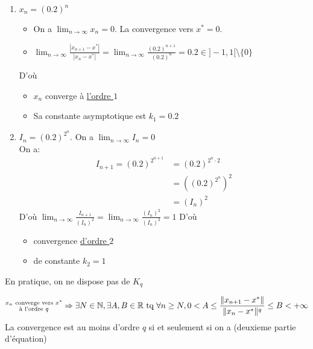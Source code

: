 \documentclass[a4paper]{report}
\begin{document}
\begin{eg}
    \begin{enumerate}
        \item 
   $x_n = (0.2)^n$ 
   \begin{itemize}
       \item On a $\lim_{n \to \infty} x_n = 0$. La convergence vers $x^* = 0$.
       \item  $\lim_{n \to \infty} \frac{|x_{n+1} - x^*|}{|x_n - x^*|} = \lim_{n \to \infty} \frac{(0.2)^{n+1}}{(0.2)^n} = 0.2 \in ]-1, 1[ \setminus \{0\}$
   \end{itemize}
   D'où
   \begin{itemize}
       \item $x_n$ converge à \underline{l'ordre $1$} 
       \item Sa constante asymptotique est \underline{$k_1 = 0.2$}
   \end{itemize}
   \item
       $I_n = (0.2)^{2^n}$. On a  $\lim_{n \to \infty} I_n = 0$\\
       On a:
       \begin{align*}
           I_{n+1} = (0.2)^{2^{n+1}} &= (0.2)^{2^n \cdot 2}\\
                                     &= \left( (0.2)^{2^n} \right)^2\\
                                     &= \left( I_n \right)^2
       \end{align*}
       D'où $\lim_{n \to \infty} \frac{I_{n+1}}{\left( I_n \right)^2} = \lim_{n \to \infty} \frac{\left( I_n \right)^2}{\left( I_n \right)^2} = 1$
       D'où
       \begin{itemize}
           \item convergence \underline{d'ordre $2$}
           \item de constante $k_2 = 1$
       \end{itemize}
\end{enumerate}
\end{eg}
En pratique, on ne dispose pas de $K_q$
 \begin{definition}
    \[
        \substack{x_n \text{ converge vers } x^*\\\text{à l'ordre } q} \Rightarrow \exists N \in \mathbb{N}, \exists A,B \in \mathbb{R} \text{ tq } \forall n \ge N, 0 < A \le \frac{\|x_{n+1} - x^*\|}{\|x_n - x^*\|^q} \le B < +\infty
    \] 
    La convergence est au moins d'ordre $q$ si et seulement si on a (deuxieme partie d'équation)
\end{definition}
\end{document}
